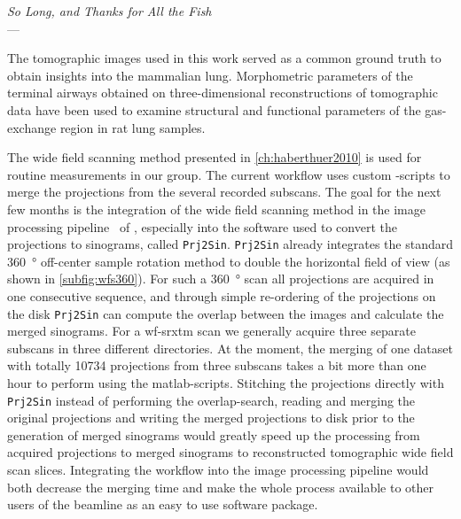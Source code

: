 \acresetall
{}\label{ch:outlook}
\begin{flushright}{\slshape    
		So Long, and Thanks for All the Fish} \\ \medskip
    ---  \citep{Adams1984}
\end{flushright}

\vfill

The tomographic images used in this work served as a common ground truth to obtain insights into the mammalian lung. Morphometric parameters of the terminal airways obtained on three-dimensional reconstructions of tomographic data have been used to examine structural and functional parameters of the gas-exchange region in rat lung samples.

The wide field scanning method presented in \autoref{ch:haberthuer2010} is used for routine measurements in our group. The current workflow uses custom -scripts to merge the projections from the several recorded subscans. The goal for the next few months is the integration of the wide field scanning method in the image processing pipeline~\cite{Hintermueller2010} of , especially into the software used to convert the projections to sinograms, called \texttt{Prj2Sin}. \texttt{Prj2Sin} already integrates the standard \SI{360}{\degree} off-center sample rotation method to double the horizontal field of view (as shown in \autoref{subfig:wfs360}). For such a \SI{360}{\degree} scan all projections are acquired in one consecutive sequence, and through simple re-ordering of the projections on the disk \texttt{Prj2Sin} can compute the overlap between the images and calculate the merged sinograms. For a \ac{wf-srxtm} scan we generally acquire three separate subscans in three different directories. At the moment, the merging of one dataset with totally \num{10734} projections from three subscans takes a bit more than one hour to perform using the \ac{matlab}-scripts. Stitching the projections directly with \texttt{Prj2Sin} instead of performing the overlap-search, reading and merging the original projections and writing the merged projections to disk prior to the generation of merged sinograms would greatly speed up the processing from acquired projections to merged sinograms to reconstructed tomographic wide field scan slices. Integrating the workflow into the image processing pipeline would both decrease the merging time and make the whole process available to other users of the beamline as an easy to use software package.

